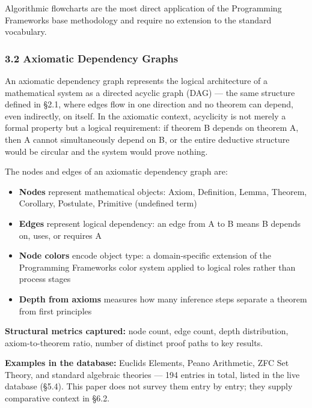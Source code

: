 \documentclass[
  11pt]{article}
\providecommand{\tightlist}{%
  \setlength{\itemsep}{0pt}\setlength{\parskip}{0pt}}
\providecommand{\tightlist}{\setlength{\itemsep}{0pt}\setlength{\parskip}{0pt}}
\begin{document}
Algorithmic flowcharts are the most direct application of the
Programming Framework\textquotesingle s base methodology and require no
extension to the standard vocabulary.

\hypertarget{32-axiomatic-dependency-graphs}{%
\subsubsection{3.2 Axiomatic Dependency
Graphs}\label{32-axiomatic-dependency-graphs}}

An axiomatic dependency graph represents the logical architecture of a
mathematical system as a directed acyclic graph (DAG) --- the same
structure defined in §2.1, where edges flow in one direction and no
theorem can depend, even indirectly, on itself. In the axiomatic
context, acyclicity is not merely a formal property but a logical
requirement: if theorem B depends on theorem A, then A cannot
simultaneously depend on B, or the entire deductive structure would be
circular and the system would prove nothing.

The nodes and edges of an axiomatic dependency graph are:

\begin{itemize}
\tightlist
\item
  \textbf{Nodes} represent mathematical objects: Axiom, Definition,
  Lemma, Theorem, Corollary, Postulate, Primitive (undefined term)
\item
  \textbf{Edges} represent logical dependency: an edge from A to B means
  B depends on, uses, or requires A
\item
  \textbf{Node colors} encode object type: a domain-specific extension
  of the Programming Framework\textquotesingle s color system applied to
  logical roles rather than process stages
\item
  \textbf{Depth from axioms} measures how many inference steps separate
  a theorem from first principles
\end{itemize}

\textbf{Structural metrics captured:} node count, edge count, depth
distribution, axiom-to-theorem ratio, number of distinct proof paths to
key results.

\textbf{Examples in the database:} Euclid\textquotesingle s Elements,
Peano Arithmetic, ZFC Set Theory, and standard algebraic theories ---
194 entries in total, listed in the live database (§5.4). This paper
does not survey them entry by entry; they supply comparative context in
§6.2.
\end{document}
